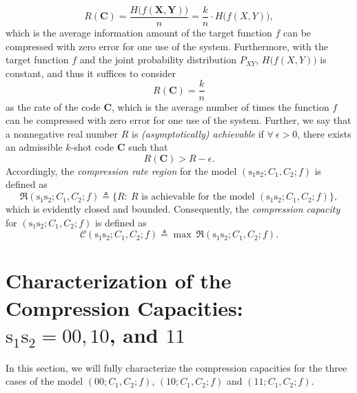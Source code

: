 \documentclass[11pt,draftclsnofoot,onecolumn]{IEEEtran}
\newcommand{\mC}{\mathcal{C}}
\newcommand{\mbC}{\mathbf{C}}
\begin{document}
     \begin{equation*}
     R(\mbC)=\frac{H\big(f(\boldsymbol{X},\boldsymbol{Y})\big)}{n}=\frac{k }{n}\cdot H\big(f(X,Y)\big),
     \end{equation*}
   which is the average information amount of the target function $f$ can be compressed with zero error for one use
of the system.
Furthermore, with the target function $f$ and the joint probability distribution $P_{XY}$,  $H\big(f(X,Y)\big)$ is constant, and thus
 it suffices to consider
 \begin{equation*}
 R(\mbC)=\frac{k}{n}
  \end{equation*}
  as the rate of the code $\mbC$, which is the average number of times the function $f$ can be compressed with zero error for one use of the
system.  Further, we say that a nonnegative real number $R$ is {\em (asymptotically) achievable} if $\forall~\epsilon > 0$, there exists an admissible $k$-shot  code $\mbC$ such that
$$ R(\mbC) > R-\epsilon.$$
 Accordingly, the {\em compression rate region} for the  model  $(\boldsymbol{\mathrm{s}}_1\boldsymbol{\mathrm{s}}_2;C_{1}, C_{2};  f)$ is defined as
 \begin{equation*}
   \mathfrak{R}(\boldsymbol{\mathrm{s}}_1\boldsymbol{\mathrm{s}}_2;C_{1}, C_{2};  f)\triangleq\Big\{R:~\text{$R$ is  achievable for the model $(\boldsymbol{\mathrm{s}}_1\boldsymbol{\mathrm{s}}_2;C_{1}, C_{2};  f)$}\Big\},
   \end{equation*}
which is evidently closed and bounded. Consequently, the {\em compression capacity} for $(\boldsymbol{\mathrm{s}}_1\boldsymbol{\mathrm{s}}_2;C_{1}, C_{2};  f)$ is defined as
\begin{equation*}\label{defi_compre-capacity}
\mC(\boldsymbol{\mathrm{s}}_1\boldsymbol{\mathrm{s}}_2;C_{1}, C_{2};  f)\triangleq  \max~\mathfrak{R}(\boldsymbol{\mathrm{s}}_1\boldsymbol{\mathrm{s}}_2;C_{1}, C_{2};  f).
\end{equation*}


\section{Characterization of the Compression Capacities: $\boldsymbol{\mathrm{s}}_1\boldsymbol{\mathrm{s}}_2=00,10$, and $11$}\label{sec:compre-cap00,10,11}

In this section, we will fully characterize the compression capacities for the three cases of the model
$(00;C_{1}, C_{2};  f)$, $(10;C_{1}, C_{2};  f)$ and $(11;C_{1}, C_{2};  f)$.
\end{document}
